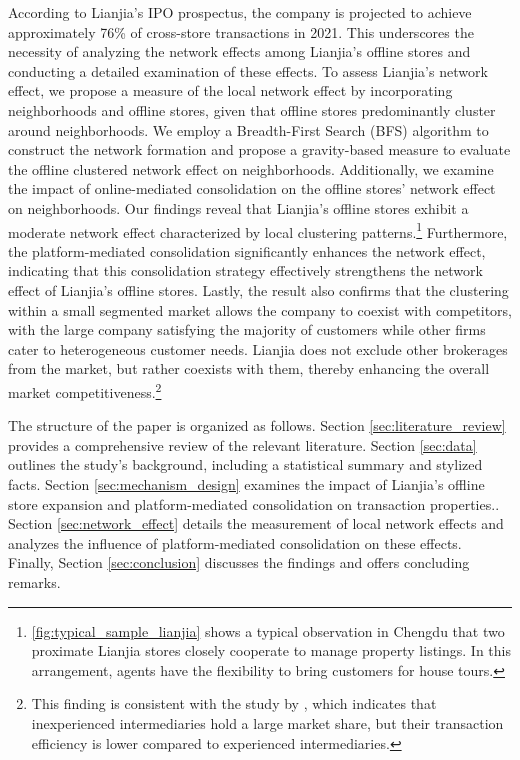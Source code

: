 \documentclass[11pt]{article}
\begin{document}
According to Lianjia's IPO prospectus, the company is projected to achieve approximately 76\% of cross-store transactions in 2021. This underscores the necessity of analyzing the network effects among Lianjia's offline stores and conducting a detailed examination of these effects. To assess Lianjia's network effect, we propose a measure of the local network effect by incorporating neighborhoods and offline stores, given that offline stores predominantly cluster around neighborhoods. We employ a Breadth-First Search (BFS) algorithm to construct the network formation and propose a gravity-based measure to evaluate the offline clustered network effect on neighborhoods. Additionally, we examine the impact of online-mediated consolidation on the offline stores' network effect on neighborhoods. Our findings reveal that Lianjia's offline stores exhibit a moderate network effect characterized by local clustering patterns.\footnote{\ref{fig:typical_sample_lianjia} shows a typical observation in Chengdu that two proximate Lianjia stores closely cooperate to manage property listings. In this arrangement, agents have the flexibility to bring customers for house tours.} Furthermore, the platform-mediated consolidation significantly enhances the network effect, indicating that this consolidation strategy effectively strengthens the network effect of Lianjia's offline stores. Lastly, the result also confirms that the clustering within a small segmented market allows the company to coexist with competitors, with the large company satisfying the majority of customers while other firms cater to heterogeneous customer needs. Lianjia does not exclude other brokerages from the market, but rather coexists with them, thereby enhancing the overall market competitiveness.\footnote{This finding is consistent with the study by \citep{gilbukh_goldsmith-pinkham_2019}, which indicates that inexperienced intermediaries hold a large market share, but their transaction efficiency is lower compared to experienced intermediaries.}

The structure of the paper is organized as follows. Section \ref{sec:literature_review} provides a comprehensive review of the relevant literature. Section \ref{sec:data} outlines the study's background, including a statistical summary and stylized facts. Section \ref{sec:mechanism_design} examines the impact of Lianjia's offline store expansion and platform-mediated consolidation on transaction properties.. Section \ref{sec:network_effect} details the measurement of local network effects and analyzes the influence of platform-mediated consolidation on these effects. Finally, Section \ref{sec:conclusion} discusses the findings and offers concluding remarks.
\end{document}
